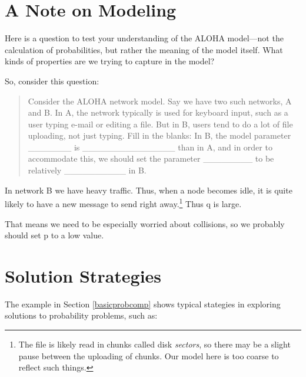 \section{A Note on Modeling}

Here is a question to test your understanding of the ALOHA model---not
the calculation of probabilities, but rather the meaning of the model
itself.  What kinds of properties are we trying to capture in the model?

So, consider this question:

\begin{quote} 

Consider the ALOHA network model.  Say we have two such networks, A and
B.  In A, the network typically is used for keyboard input, such as a
user typing e-mail or editing a file.  But in B, users tend to do a lot
of file uploading, not just typing.  Fill in the blanks:  In B, the
model parameter \_\_\_\_\_\_\_ is \_\_\_\_\_\_\_\_\_\_\_\_\_\_\_ than in
A, and in order to accommodate this, we should set the parameter
\_\_\_\_\_\_\_\_ to be relatively \_\_\_\_\_\_\_\_\_\_ in B.

\end{quote}

In network B we have heavy traffic.  Thus, when a node becomes idle, it
is quite likely to have a new message to send right away.\footnote{The
file is likely read in chunks called disk {\it sectors}, so there may be
a slight pause between the uploading of chunks.  Our model here is too
coarse to reflect such things.}  Thus q is large.

That means we need to be especially worried about collisions, so we
probably should set p to a low value.

\section{Solution Strategies}

The example in Section \ref{basicprobcomp} shows typical stategies in
exploring solutions to probability problems, such as:


